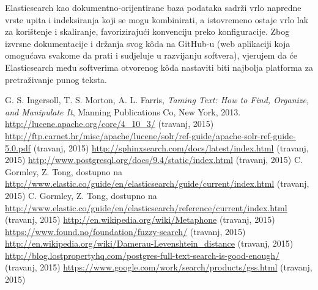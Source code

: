 \documentclass[a4paper,twoside,12pt]{scrreprt}
\begin{document}
Elasticsearch kao dokumentno-orijentirane baza podataka sadrži vrlo napredne vrste upita i indeksiranja koji se mogu kombinirati, a istovremeno ostaje vrlo lak za korištenje i skaliranje, favorizirajući konvenciju preko konfiguracije. Zbog izvrsne dokumentacije i držanja svog kôda na GitHub-u (web aplikaciji koja omogućava svakome da prati i sudjeluje u razvijanju softvera), vjerujem da će Elasticsearch među softverima otvorenog kôda nastaviti biti najbolja platforma za pretraživanje punog teksta.

\begin{thebibliography}{99}
   G. S. Ingersoll, T. S. Morton, A. L. Farris, \textit{Taming Text: How to Find, Organize, and Manipulate It}, Manning Publications Co, New York, 2013.
   \url{http://lucene.apache.org/core/4_10_3/} (travanj, 2015)
   \url{http://ftp.carnet.hr/misc/apache/lucene/solr/ref-guide/apache-solr-ref-guide-5.0.pdf} (travanj, 2015)
   \url{http://sphinxsearch.com/docs/latest/index.html} (travanj, 2015)
   \url{http://www.postgresql.org/docs/9.4/static/index.html} (travanj, 2015)
   C. Gormley, Z. Tong, dostupno na \url{http://www.elastic.co/guide/en/elasticsearch/guide/current/index.html} (travanj, 2015)
   C. Gormley, Z. Tong, dostupno na \url{http://www.elastic.co/guide/en/elasticsearch/reference/current/index.html} (travanj, 2015)
   \url{http://en.wikipedia.org/wiki/Metaphone} (travanj, 2015)
   \url{https://www.found.no/foundation/fuzzy-search/} (travanj, 2015)
   \url{http://en.wikipedia.org/wiki/Damerau-Levenshtein_distance} (travanj, 2015)
   \url{http://blog.lostpropertyhq.com/postgres-full-text-search-is-good-enough/} (travanj, 2015)
   \url{https://www.google.com/work/search/products/gss.html} (travanj, 2015)
\end{thebibliography}

\pagestyle{empty}
\end{document}
